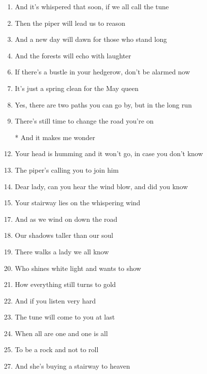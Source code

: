\documentclass{article}
\begin{document}
\begin{center}
\begin{enumerate}
            \item And it's whispered that soon, if we all call the tune
            \item Then the piper will lead us to reason
            \item And a new day will dawn for those who stand long
            \item And the forests will echo with laughter

            \item[]

            \item If there's a bustle in your hedgerow, don't be alarmed now
            \item It's just a spring clean for the May queen
            \item Yes, there are two paths you can go by, but in the long run
            \item There's still time to change the road you're on

            \item[]
            \item[*] And it makes me wonder
            \pagebreak

            \item Your head is humming and it won't go, in case you don't know
            \item The piper's calling you to join him
            \item Dear lady, can you hear the wind blow, and did you know
            \item Your stairway lies on the whispering wind

            \item[]

            \item And as we wind on down the road
            \item Our shadows taller than our soul
            \item There walks a lady we all know
            \item Who shines white light and wants to show
            \item How everything still turns to gold
            \item And if you listen very hard
            \item The tune will come to you at last
            \item When all are one and one is all
            \item To be a rock and not to roll

            \item[]

            \item And she's buying a stairway to heaven

        \end{enumerate} 
    \end{center}
\end{document}
